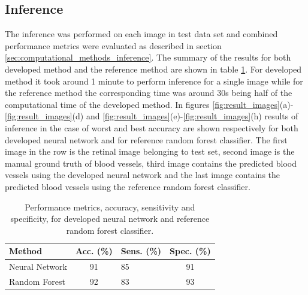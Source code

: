 \documentclass[aps,prb,10pt,twocolumn,groupedaddress]{revtex4-1}
\begin{document}
\subsection{Inference}
\label{sec:results_inference}
The inference was performed on each image in test data set and combined performance metrics were evaluated as described in section  \ref{sec:computational_methods_inference}. The summary of the results for both developed method and the reference method are shown in table \ref{tab:performance_metrics}. For developed method it took around 1 minute to perform inference for a single image while for the reference method the corresponding time was around 30s being half of the computational time of the developed method. In figures \ref{fig:result_images}(a)-\ref{fig:result_images}(d) and \ref{fig:result_images}(e)-\ref{fig:result_images}(h) results of inference in the case of worst and best accuracy are shown respectively for both developed neural network and for reference random forest classifier. The first image in the row is the retinal image belonging to test set, second image is the manual ground truth of blood vessels, third image contains the predicted blood vessels using the developed neural network and the last image contains the predicted blood vessels using the reference random forest classifier.
\begin{center}
	\begin{table}[h]
		\begin{tabular*}{0.45\textwidth}{lclc}
			Method & Acc. (\%) & Sens. (\%) & Spec. (\%)\\
			\hline
			Neural Network & 91 & 85 & 91\\
			Random Forest & 92 & 83 & 93\\
			\end{tabular*}
		\caption{Performance metrics, accuracy, sensitivity and specificity, for developed neural network and reference random forest classifier.}
		\label{tab:performance_metrics}
	\end{table}
\end{center}
\end{document}
